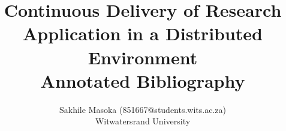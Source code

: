 \documentclass [titlepage,11pt]{article}
\title{\Huge Continuous Delivery of Research Application in a Distributed Environment \\\medskip Annotated Bibliography}
\author{Sakhile Masoka (851667@students.wits.ac.za)\\Witwatersrand University}
\begin{document}
\maketitle
\nocite{*}

\end{document}
